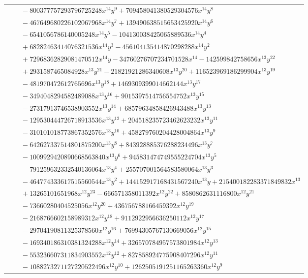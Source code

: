 \documentclass[11pt]{article}
\begin{document}
\begin{longtable}{@{}ll@{}}
 & $\quad -800377757293796725248x^{14}y^{9}+709458041380529304576x^{14}y^{8}$\\
 & $\quad -467649680226102067968x^{14}y^{7}+139490638515653425920x^{14}y^{6}$\\
 & $\quad -6541056786140005248x^{14}y^{5}-104130038425065889536x^{14}y^{4}$\\
 & $\quad +68282463414076321536x^{14}y^{3}-456104135414870298288x^{14}y^{2}$\\
 & $\quad +72968362829081470512x^{14}y-34760276707234701528x^{14}-142599842758656x^{13}y^{22}$\\
 & $\quad +2931587465084928x^{13}y^{21}-21821921286340608x^{13}y^{20}+116523969186299904x^{13}y^{19}$\\
 & $\quad -481970472612765696x^{13}y^{18}+1469309399014662144x^{13}y^{17}$\\
 & $\quad -3494048294582489088x^{13}y^{16}+9015397514756554752x^{13}y^{15}$\\
 & $\quad -27317913746538903552x^{13}y^{14}+68579634858426943488x^{13}y^{13}$\\
 & $\quad -129530444726718913536x^{13}y^{12}+204518235723462623232x^{13}y^{11}$\\
 & $\quad -310101018773867352576x^{13}y^{10}+458279760204428004864x^{13}y^{9}$\\
 & $\quad -642627337514801875200x^{13}y^{8}+843928885376288234496x^{13}y^{7}$\\
 & $\quad -1009929420890668563840x^{13}y^{6}+945831474749555224704x^{13}y^{5}$\\
 & $\quad -791259632332540136064x^{13}y^{4}+255707001564583580064x^{13}y^{3}$\\
 & $\quad -464774333617515560544x^{13}y^{2}+144152917168431567240x^{13}y+215400182283371849832x^{13}$\\
 & $\quad +13265101651968x^{12}y^{23}-666571358011392x^{12}y^{22}+8580862631116800x^{12}y^{21}$\\
 & $\quad -73660280404525056x^{12}y^{20}+436756788166459392x^{12}y^{19}$\\
 & $\quad -2168766602158989312x^{12}y^{18}+9112922956636250112x^{12}y^{17}$\\
 & $\quad -29704190811325378560x^{12}y^{16}+76994305767130669056x^{12}y^{15}$\\
 & $\quad -169340186310381324288x^{12}y^{14}+326570784957573801984x^{12}y^{13}$\\
 & $\quad -553236607311834903552x^{12}y^{12}+827858924775908407296x^{12}y^{11}$\\
 & $\quad -1088273271127220522496x^{12}y^{10}+1262505191251165263360x^{12}y^{9}$\\

\end{longtable}
\end{document}

